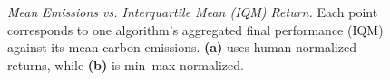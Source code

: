 \begin{figure} 
	\centering
	\quad
	\caption{\emph{Mean Emissions vs. Interquartile Mean (IQM) Return.}
		Each point corresponds to one algorithm's aggregated final performance (IQM) against its mean carbon emissions. 
		\textbf{(a)} uses human‐normalized returns, while \textbf{(b)} is min--max normalized.}
	\label{fig:scatter_emissions_a}
\end{figure}

